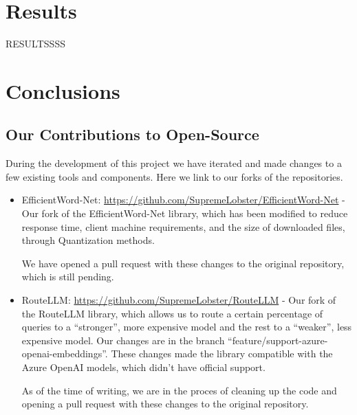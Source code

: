 \documentclass[a4paper,12pt,twoside]{ThesisStyle}
\begin{document}
\chapter{Results}
\label{cap:results}

RESULTSSSS

\chapter{Conclusions}
\label{cap:conclusions}

\section{Our Contributions to Open-Source}
\label{sec:oss_contributions}

During the development of this project we have iterated and made changes to a few existing tools and components. Here we link to our forks of the repositories.

\begin{itemize}
  \item EfficientWord-Net: \url{https://github.com/SupremeLobster/EfficientWord-Net} - Our fork of the EfficientWord-Net library, which has been modified to reduce response time, client machine requirements, and the size of downloaded files, through Quantization methods.
  
  We have opened a pull request with these changes to the original repository, which is still pending.
  \item RouteLLM: \url{https://github.com/SupremeLobster/RouteLLM} - Our fork of the RouteLLM library, which allows us to route a certain percentage of queries to a ``stronger'', more expensive model and the rest to a ``weaker'', less expensive model. Our changes are in the branch ``feature/support-azure-openai-embeddings''. These changes made the library compatible with the Azure OpenAI models, which didn't have official support.
  
  As of the time of writing, we are in the proces of cleaning up the code and opening a pull request with these changes to the original repository.
\end{itemize}

\backmatter

% 





\appendix

\end{document}
